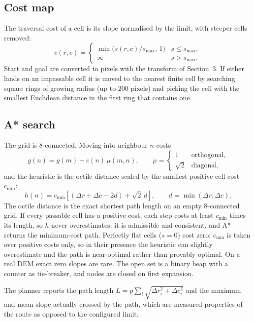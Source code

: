\documentclass[11pt,a4paper]{article}
\begin{document}
\subsection{Cost map}
The traversal cost of a cell is its slope normalised by the limit, with steeper cells removed:
\begin{equation}
  c(r,c) = \begin{cases}
    \min\!\big(s(r,c)/s_{\max},\,1\big) & s\le s_{\max},\\
    \infty & s> s_{\max}.
  \end{cases}
\end{equation}
Start and goal are converted to pixels with the transform of Section~3. If either lands on an
impassable cell it is moved to the nearest finite cell by searching square rings of growing
radius (up to 200 pixels) and picking the cell with the smallest Euclidean distance in the first
ring that contains one.

\subsection{A* search}
The grid is 8-connected. Moving into neighbour $n$ costs
\begin{equation}
  g(n) = g(m) + c(n)\,\mu(m,n),\qquad \mu=\begin{cases}1&\text{orthogonal},\\\sqrt2&\text{diagonal},\end{cases}
\end{equation}
and the heuristic is the octile distance scaled by the smallest positive cell cost
$c_{\min}$:
\begin{equation}
  h(n) = c_{\min}\left[(\Delta r+\Delta c-2d)+\sqrt2\,d\right],\qquad d=\min(\Delta r,\Delta c).
\end{equation}
The octile distance is the exact shortest path length on an empty 8-connected grid. If every
passable cell has a positive cost, each step costs at least $c_{\min}$ times its length, so $h$
never overestimates: it is admissible and consistent, and A* returns the minimum-cost path.
Perfectly flat cells ($s=0$) cost zero; $c_{\min}$ is taken over positive costs only, so in
their presence the heuristic can slightly overestimate and the path is near-optimal rather than
provably optimal. On a real DEM exact zero slopes are rare. The open set is a binary heap with a counter as tie-breaker, and nodes are closed on
first expansion.

The planner reports the path length
$L=p\sum_i\sqrt{\Delta r_i^2+\Delta c_i^2}$ and the maximum and mean slope actually crossed by
the path, which are measured properties of the route as opposed to the configured limit.
\end{document}
